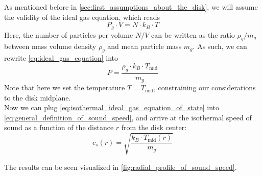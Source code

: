         As mentioned before in \cref{sec:first_assumptions_about_the_disk}, we will assume the 
        validity of the ideal gas equation, which reads
        \begin{equation}
            \label{eq:ideal_gas_equation}
            P_g \cdot V = N \cdot k_B \cdot T
        \end{equation}
        Here, the number of particles per volume $N / V$ can be written as the ratio $\rho_g / m_g$
        between mass volume density $\rho_g$ and mean particle mass $m_g$. As such, we can rewrite
        \cref{eq:ideal_gas_equation} into
        \begin{equation}
            \label{eq:isothermal_ideal_gas_equation_of_state}
            P = \frac{\rho_g \cdot k_B \cdot T_\text{mid}}{m_g}
        \end{equation}
        Note that here we set the temperature $T = T_\text{mid}$, constraining our considerations 
        to the disk midplane. \\


        Now we can plug \cref{eq:isothermal_ideal_gas_equation_of_state} into
        \cref{eq:general_definition_of_sound_speed}, and arrive at the isothermal speed of sound
        as a function of the distance $r$ from the disk center:
        \begin{equation}
            c_s(r) = \sqrt{\frac{k_B \cdot T_\text{mid}(r)}{m_g}}
        \end{equation}


        The results can be seen visualized in \cref{fig:radial_profile_of_sound_speed}.

